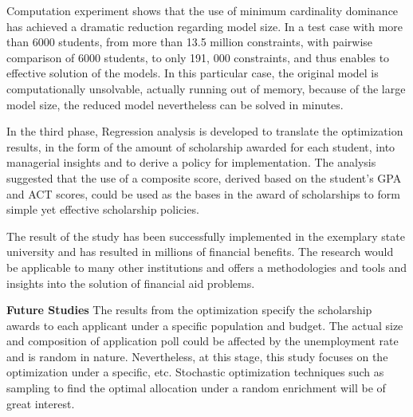 \documentclass[12pt,english]{report}
\begin{document}
Computation experiment shows that the use of minimum cardinality dominance has achieved a dramatic reduction regarding model size. In a test case with more than 6000 students,  from more than 13.5 million constraints, with pairwise comparison of 6000 students, to only 191, 000 constraints, and thus enables to effective solution of the models.   In this particular case,  the original model is computationally unsolvable, actually running out of memory, because of the large model size,  the reduced model nevertheless can be solved in minutes.

In the third phase, Regression analysis is developed to translate the optimization results, in the form of the  amount of scholarship awarded for each student, into managerial insights and to derive a policy for implementation.  The analysis suggested that the use of a composite score, derived based on the student's GPA and ACT scores, could be used as the bases in the award of scholarships to form simple yet effective scholarship policies.

The result of the study has been successfully implemented in the exemplary state university and has resulted in millions of financial benefits.  The research would be applicable to many other institutions and offers a methodologies and tools and insights into the solution of financial aid problems. 

\noindent \textbf{Future Studies}
The results from the optimization specify the scholarship awards to each applicant under a specific population and budget.  The actual size and composition of application poll could be affected by the unemployment rate and is random in nature.  Nevertheless, at this stage, this study focuses on the optimization under a specific, etc.  Stochastic optimization techniques such as sampling  to find the optimal allocation under a random enrichment will be of great interest. 

\end{document}
